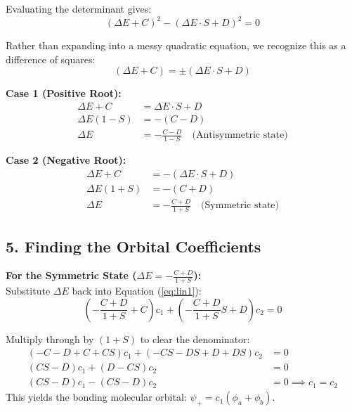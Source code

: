 \documentclass{book}
\begin{document}
Evaluating the determinant gives:
\begin{equation}
    (\Delta E + C)^2 - (\Delta E \cdot S + D)^2 = 0
\end{equation}

Rather than expanding into a messy quadratic equation, we recognize this as a difference of squares:
\begin{equation}
    (\Delta E + C) = \pm (\Delta E \cdot S + D)
\end{equation}

\textbf{Case 1 (Positive Root):}
\begin{align*}
    \Delta E + C &= \Delta E \cdot S + D \\
    \Delta E(1 - S) &= -(C - D) \\
    \Delta E &= -\frac{C - D}{1 - S} \quad \text{(Antisymmetric state)}
\end{align*}
% 

\textbf{Case 2 (Negative Root):}
\begin{align*}
    \Delta E + C &= -(\Delta E \cdot S + D) \\
    \Delta E(1 + S) &= -(C + D) \\
    \Delta E &= -\frac{C + D}{1 + S} \quad \text{(Symmetric state)}
\end{align*}
% 

\subsection*{5. Finding the Orbital Coefficients}
\textbf{For the Symmetric State ($\Delta E = -\frac{C+D}{1+S}$):} \\
Substitute $\Delta E$ back into Equation (\ref{eq:lin1}):
\begin{equation}
    \left( -\frac{C+D}{1+S} + C \right)c_1 + \left( -\frac{C+D}{1+S}S + D \right)c_2 = 0
\end{equation}

Multiply through by $(1+S)$ to clear the denominator:
\begin{align*}
    (-C - D + C + CS)c_1 + (-CS - DS + D + DS)c_2 &= 0 \\
    (CS - D)c_1 + (D - CS)c_2 &= 0 \\
    (CS - D)c_1 - (CS - D)c_2 &= 0 \implies c_1 = c_2
\end{align*}
This yields the bonding molecular orbital: $\psi_+ = c_1(\phi_a + \phi_b)$.

\vspace{0.5cm}
\end{document}
